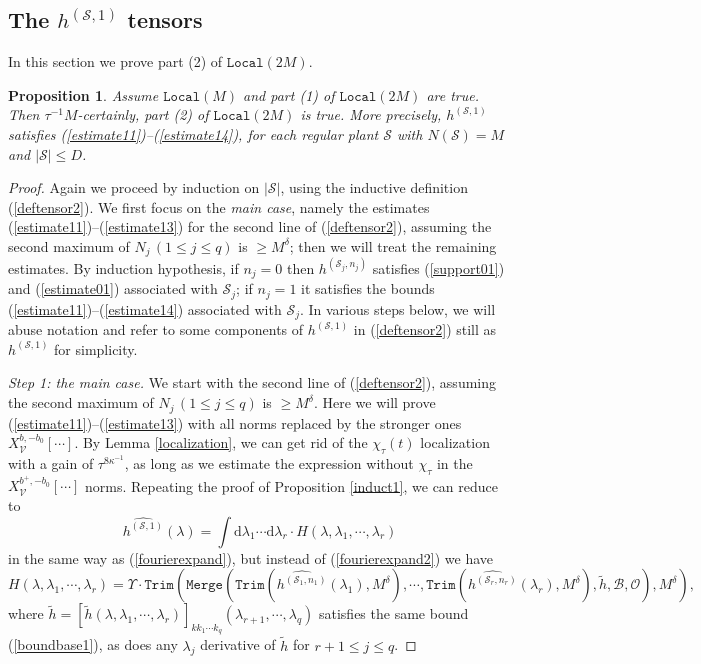 \documentclass[11 pt,reqno]{amsart}
\newtheorem{prop}[thm]{Proposition}
\theoremstyle{definition}
\theoremstyle{remark}
\numberwithin{equation}{section}
\newcommand{\Sc}{\mathcal{S}}
\newcommand{\Vc}{\mathcal{V}}
\newcommand{\Bs}{\mathscr{B}}
\newcommand{\Os}{\mathscr{O}}
\begin{document}
{\subsection{The $h^{(\Sc,1)}$ tensors} In this section we prove part (2) of $\mathtt{Local}(2M)$.
\begin{prop}\label{induct2} Assume $\mathtt{Local}(M)$ and part (1) of $\mathtt{Local}(2M)$ are true. Then $\tau^{-1}M$-certainly, part (2) of $\mathtt{Local}(2M)$ is true. More precisely, $h^{(\Sc,1)}$ satisfies (\ref{estimate11})--(\ref{estimate14}), for each regular plant $\Sc$ with $N(\Sc)=M$ and $|\Sc|\leq D$.
\end{prop}
\begin{proof} Again we proceed by induction on $|\Sc|$, using the inductive definition (\ref{deftensor2}). We first focus on the \emph{main case}, namely the estimates (\ref{estimate11})--(\ref{estimate13}) for the second line of (\ref{deftensor2}), assuming the second maximum of $N_j\,(1\leq j\leq q)$ is $\geq M^\delta$; then we will treat the remaining estimates. By induction hypothesis, if $n_j=0$ then $h^{(\Sc_j,n_j)}$ satisfies (\ref{support01}) and (\ref{estimate01}) associated with $\Sc_j$; if $n_j=1$ it satisfies the bounds (\ref{estimate11})--(\ref{estimate14}) associated with $\Sc_j$. In various steps below, we will abuse notation and refer to some components of $h^{(\Sc,1)}$ in (\ref{deftensor2}) still as $h^{(\Sc,1)}$ for simplicity.

\emph{Step 1: the main case.} We start with the second line of (\ref{deftensor2}), assuming the second maximum of $N_j\,(1\leq j\leq q)$ is $\geq M^\delta$. Here we will prove (\ref{estimate11})--(\ref{estimate13}) with all norms replaced by the stronger ones $X_\Vc^{b,-b_0}[\cdots]$. By Lemma \ref{localization}, we can get rid of the $\chi_\tau(t)$ localization with a gain of $\tau^{8\kappa^{-1}}$, as long as we estimate the expression without $\chi_\tau$ in the $X_\Vc^{b^+,-b_0}[\cdots]$ norms. Repeating the proof of Proposition \ref{induct1}, we can reduce to
\begin{equation}\label{prop7.3:hs1_1}
\widehat{h^{(\Sc,1)}}(\lambda)=\int\mathrm{d}\lambda_1\cdots\mathrm{d}\lambda_r\cdot H(\lambda,\lambda_1,\cdots,\lambda_r)
\end{equation} in the same way as (\ref{fourierexpand}), but instead of (\ref{fourierexpand2}) we have
\begin{equation}\label{newmergedef}H(\lambda,\lambda_1,\cdots,\lambda_r)=\Upsilon\cdot\mathtt{Trim}(\mathtt{Merge}(\mathtt{Trim}(\widehat{h^{(\Sc_1,n_1)}}(\lambda_1),M^\delta),\cdots,\mathtt{Trim}(\widehat{h^{(\Sc_r,n_r)}}(\lambda_r),M^\delta),\widetilde{h},\Bs,\Os),M^\delta),
\end{equation} where $\widetilde{h}=[\widetilde{h}(\lambda,\lambda_1,\cdots,\lambda_r)]_{kk_1\cdots k_q}(\lambda_{r+1},\cdots,\lambda_q)$ satisfies the same bound (\ref{boundbase1}), as does any $\lambda_j$ derivative of $\widetilde{h}$ for $r+1\leq j\leq q$.


\end{proof}}
\end{document}
